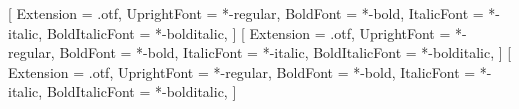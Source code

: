 %
%

\usepackage[english]{babel}
\usepackage{fontspec}

\setmainfont{texgyrepagella}[
  Extension      = .otf,
  UprightFont    = *-regular,
  BoldFont       = *-bold,
  ItalicFont     = *-italic,
  BoldItalicFont = *-bolditalic,
]
\setsansfont{texgyreheros}[
  Extension      = .otf,
  UprightFont    = *-regular,
  BoldFont       = *-bold,
  ItalicFont     = *-italic,
  BoldItalicFont = *-bolditalic,
]
\setmonofont{texgyrecursor}[
  Extension      = .otf,
  UprightFont    = *-regular,
  BoldFont       = *-bold,
  ItalicFont     = *-italic,
  BoldItalicFont = *-bolditalic,
]

